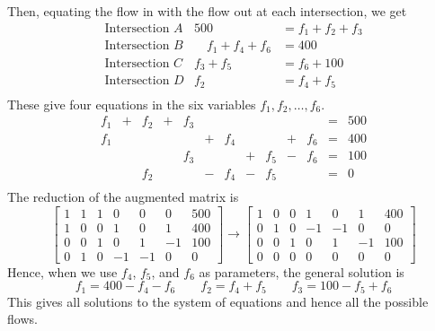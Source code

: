 \documentclass{ximera}
\begin{document}
\begin{example}
\begin{explanation}
Then, equating the flow in with the flow out at each intersection, we get
\begin{equation*}
\begin{array}{lrl}
	\mbox{Intersection } A & 500 					& = f_1 + f_2 + f_3 \\
	\mbox{Intersection } B & \quad f_1 + f_4 + f_6 	& = 400 \\
	\mbox{Intersection } C & f_3 + f_5 				& = f_6 + 100 \\
	\mbox{Intersection } D & f_2					& = f_4 + f_5 \\
\end{array}
\end{equation*}
These give four equations in the six variables $ f_1, f_2, \dots , f_6 $.
\begin{equation*}
\begin{array}{rlrlrlrlrlrcr}
	f_1 & + & f_2 & + & f_3 &   &     &   &     &   &     & = & 500 \\
	f_1 &   &     &   &     & + & f_4 &   &     & + & f_6 & = & 400 \\
	    &   &     &   & f_3 &   &     & + & f_5 & - & f_6 & = & 100 \\
	    &   & f_2 &   &     & - & f_4 & - & f_5 &   &     & = & 0 \\
\end{array}
\end{equation*}
The reduction of the augmented matrix is
\begin{equation*}
\left[ \begin{array}{rrrrrr|r}
	1 & 1 & 1 & 0 & 0 & 0 & 500 \\
	1 & 0 & 0 & 1 & 0 & 1 & 400 \\
	0 & 0 & 1 & 0 & 1 &-1 & 100 \\
	0 & 1 & 0 &-1 &-1 & 0 & 0
\end{array} \right]
\rightarrow
\left[ \begin{array}{rrrrrr|r}
	1 & 0 & 0 & 1 & 0 & 1 & 400 \\
	0 & 1 & 0 &-1 &-1 & 0 & 0 \\
	0 & 0 & 1 & 0 & 1 &-1 & 100 \\
	0 & 0 & 0 & 0 & 0 & 0 & 0
\end{array} \right]
\end{equation*}
Hence, when we use $f_4$, $f_5$, and $f_6$ as parameters, the general solution is
\begin{equation*}
f_1 = 400 - f_4 - f_6 \quad\quad f_2 = f_4 + f_5 \quad\quad f_3 = 100 - f_5 + f_6
\end{equation*}
This gives all solutions to the system of equations and hence all the possible flows.


\end{explanation}
\end{example}
\end{document}
